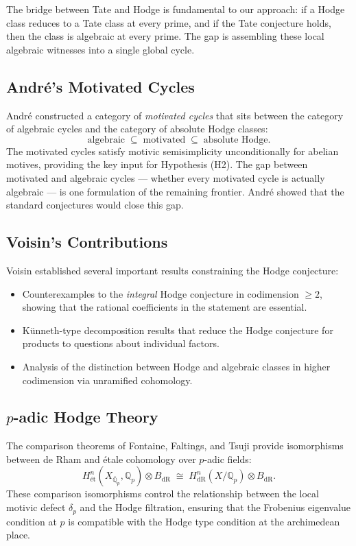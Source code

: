 \documentclass[11pt]{article}
\theoremstyle{definition}
\begin{document}
The bridge between Tate and Hodge is fundamental to our approach: if a Hodge
class reduces to a Tate class at every prime, and if the Tate conjecture holds,
then the class is algebraic at every prime.  The gap is assembling these
local algebraic witnesses into a single global cycle.

\subsection{Andr\'e's Motivated Cycles}

Andr\'e \cite{Andre} constructed a category of \emph{motivated cycles} that
sits between the category of algebraic cycles and the category of absolute
Hodge classes:
\[
  \text{algebraic} \;\subseteq\; \text{motivated} \;\subseteq\; \text{absolute Hodge}.
\]
The motivated cycles satisfy motivic semisimplicity unconditionally for
abelian motives, providing the key input for Hypothesis (H2).  The gap
between motivated and algebraic cycles --- whether every motivated cycle
is actually algebraic --- is one formulation of the remaining frontier.
Andr\'e showed that the standard conjectures would close this gap.

\subsection{Voisin's Contributions}

Voisin \cite{Voisin} established several important results constraining
the Hodge conjecture:
\begin{itemize}
  \item Counterexamples to the \emph{integral} Hodge conjecture in
    codimension $\geq 2$, showing that the rational coefficients in the
    statement are essential.
  \item K\"unneth-type decomposition results that reduce the Hodge
    conjecture for products to questions about individual factors.
  \item Analysis of the distinction between Hodge and algebraic classes
    in higher codimension via unramified cohomology.
\end{itemize}

\subsection{$p$-adic Hodge Theory}

The comparison theorems of Fontaine, Faltings, and Tsuji provide
isomorphisms between de Rham and \'etale cohomology over $p$-adic fields:
\[
  H^n_{\text{\'et}}(X_{\bar{\mathbb{Q}}_p}, \mathbb{Q}_p) \otimes B_{\mathrm{dR}}
  \;\cong\;
  H^n_{\mathrm{dR}}(X/\mathbb{Q}_p) \otimes B_{\mathrm{dR}}.
\]
These comparison isomorphisms control the relationship between the local
motivic defect $\delta_p$ and the Hodge filtration, ensuring that the
Frobenius eigenvalue condition at $p$ is compatible with the Hodge type
condition at the archimedean place.
\end{document}
